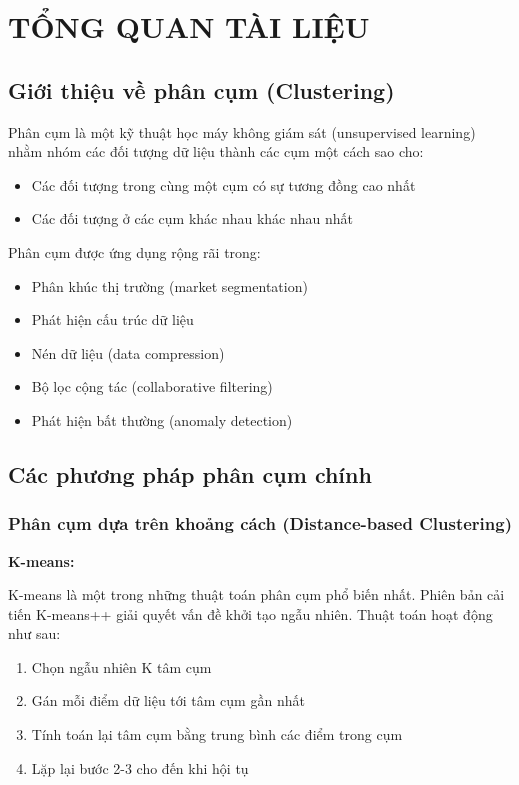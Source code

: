 \chapter{TỔNG QUAN TÀI LIỆU}

\section{Giới thiệu về phân cụm (Clustering)}

Phân cụm là một kỹ thuật học máy không giám sát (unsupervised learning) \cite{bishop_ml} nhằm nhóm các đối tượng dữ liệu thành các cụm một cách sao cho:

\begin{itemize}
    \item Các đối tượng trong cùng một cụm có sự tương đồng cao nhất
    \item Các đối tượng ở các cụm khác nhau khác nhau nhất
\end{itemize}

Phân cụm được ứng dụng rộng rãi trong:
\begin{itemize}
    \item Phân khúc thị trường (market segmentation)
    \item Phát hiện cấu trúc dữ liệu
    \item Nén dữ liệu (data compression)
    \item Bộ lọc cộng tác (collaborative filtering)
    \item Phát hiện bất thường (anomaly detection)
\end{itemize}

\section{Các phương pháp phân cụm chính}

\subsection{Phân cụm dựa trên khoảng cách (Distance-based Clustering)}

\textbf{K-means:}

K-means \cite{kmeans_original} là một trong những thuật toán phân cụm phổ biến nhất. Phiên bản cải tiến K-means++ \cite{kmeans_plus_plus} giải quyết vấn đề khởi tạo ngẫu nhiên. Thuật toán hoạt động như sau:

\begin{enumerate}
    \item Chọn ngẫu nhiên K tâm cụm
    \item Gán mỗi điểm dữ liệu tới tâm cụm gần nhất
    \item Tính toán lại tâm cụm bằng trung bình các điểm trong cụm
    \item Lặp lại bước 2-3 cho đến khi hội tụ
\end{enumerate}

